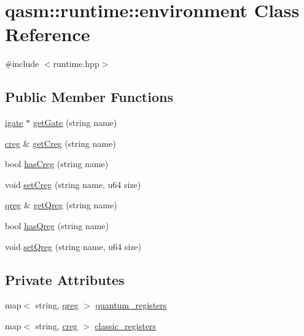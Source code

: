 \hypertarget{classqasm_1_1runtime_1_1environment}{}\section{qasm\+:\+:runtime\+:\+:environment Class Reference}
\label{classqasm_1_1runtime_1_1environment}


{\ttfamily \#include $<$runtime.\+hpp$>$}

\subsection*{Public Member Functions}
\begin{DoxyCompactItemize}
\item 
\hyperlink{classqlib_1_1quantum_1_1gates_1_1igate}{igate} $\ast$ \hyperlink{classqasm_1_1runtime_1_1environment_adb75f9df54d04d4f5d51c92093b5d466}{get\+Gate} (string name)
\item 
\hyperlink{runtime_8hpp_a20cf870406c99de2d935e3a77b8b60da}{creg} \& \hyperlink{classqasm_1_1runtime_1_1environment_a78ac575d7245e21c65fb31e6585c38cc}{get\+Creg} (string name)
\item 
bool \hyperlink{classqasm_1_1runtime_1_1environment_a4cd69bebda4f5957e52168c91654f5f5}{has\+Creg} (string name)
\item 
void \hyperlink{classqasm_1_1runtime_1_1environment_a976c4f032feee9c47af587a0f6c759ae}{set\+Creg} (string name, u64 size)
\item 
\hyperlink{classqlib_1_1quantum_1_1qreg}{qreg} \& \hyperlink{classqasm_1_1runtime_1_1environment_ae4f47f020b8baf4f94165345f26a6dca}{get\+Qreg} (string name)
\item 
bool \hyperlink{classqasm_1_1runtime_1_1environment_a77a8db656f3c5b5a2fcdde9a205deee5}{has\+Qreg} (string name)
\item 
void \hyperlink{classqasm_1_1runtime_1_1environment_acd773cf48993b56c9f6b6b353a5a5e6a}{set\+Qreg} (string name, u64 size)
\end{DoxyCompactItemize}
\subsection*{Private Attributes}
\begin{DoxyCompactItemize}
\item 
map$<$ string, \hyperlink{classqlib_1_1quantum_1_1qreg}{qreg} $>$ \hyperlink{classqasm_1_1runtime_1_1environment_ae65dc834296334c8b9ea6dd900210881}{quantum\+\_\+registers}
\item 
map$<$ string, \hyperlink{runtime_8hpp_a20cf870406c99de2d935e3a77b8b60da}{creg} $>$ \hyperlink{classqasm_1_1runtime_1_1environment_add156869a2a13e2ca877c39e4649757a}{classic\+\_\+registers}
\end{DoxyCompactItemize}



